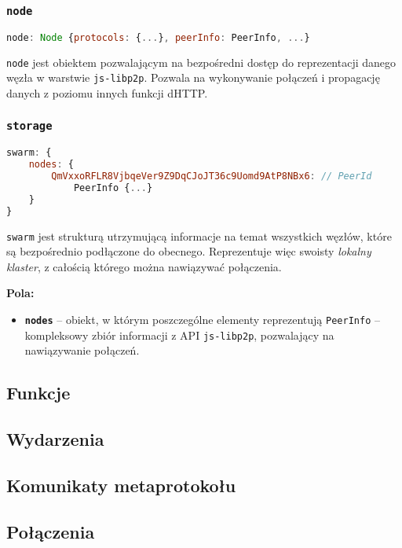 % 

\subsubsection{\texttt{node}}
\begin{lstlisting}[language=javascript]
    node: Node {protocols: {...}, peerInfo: PeerInfo, ...}
\end{lstlisting}
\texttt{node} jest obiektem pozwalającym na bezpośredni dostęp do reprezentacji danego węzła w warstwie \texttt{js-libp2p}. Pozwala na wykonywanie połączeń i propagację danych z poziomu innych funkcji dHTTP.

% 

\subsubsection{\texttt{storage}}
\begin{lstlisting}[language=javascript]
swarm: { 
    nodes: { 
        QmVxxoRFLR8VjbqeVer9Z9DqCJoJT36c9Uomd9AtP8NBx6: // PeerId
            PeerInfo {...}
    } 
}
\end{lstlisting}
\texttt{swarm} jest strukturą utrzymującą informacje na temat wszystkich węzłów, które są bezpośrednio podłączone do obecnego. Reprezentuje więc swoisty {\em lokalny klaster}, z całością którego można nawiązywać połączenia.

\textbf{Pola:}
\begin{itemize}
    \item \textbf{\texttt{nodes}} -- obiekt, w którym poszczególne elementy reprezentują \texttt{PeerInfo} -- kompleksowy zbiór informacji z API \texttt{js-libp2p}, pozwalający na nawiązywanie połączeń.
\end{itemize}


\subsection{Funkcje}

\subsection{Wydarzenia}
\subsection{Komunikaty metaprotokołu}
\subsection{Połączenia}